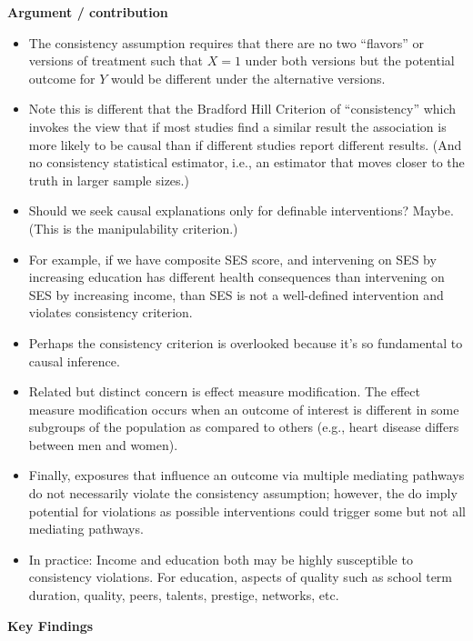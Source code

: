 \documentclass[
]{book}
\providecommand{\tightlist}{%
  \setlength{\itemsep}{0pt}\setlength{\parskip}{0pt}}
\begin{document}
\textbf{Argument / contribution}

\begin{itemize}
\tightlist
\item
  The consistency assumption requires that there are no two ``flavors'' or versions of treatment such that \(X = 1\) under both versions but the potential outcome for \(Y\) would be different under the alternative versions.
\item
  Note this is different that the Bradford Hill Criterion of ``consistency'' which invokes the view that if most studies find a similar result the association is more likely to be causal than if different studies report different results. (And no consistency statistical estimator, i.e., an estimator that moves closer to the truth in larger sample sizes.)
\item
  Should we seek causal explanations only for definable interventions? Maybe. (This is the manipulability criterion.)
\item
  For example, if we have composite SES score, and intervening on SES by increasing education has different health consequences than intervening on SES by increasing income, than SES is not a well-defined intervention and violates consistency criterion.
\item
  Perhaps the consistency criterion is overlooked because it's so fundamental to causal inference.
\item
  Related but distinct concern is effect measure modification. The effect measure modification occurs when an outcome of interest is different in some subgroups of the population as compared to others (e.g., heart disease differs between men and women).
\item
  Finally, exposures that influence an outcome via multiple mediating pathways do not necessarily violate the consistency assumption; however, the do imply potential for violations as possible interventions could trigger some but not all mediating pathways.
\item
  In practice: Income and education both may be highly susceptible to consistency violations. For education, aspects of quality such as school term duration, quality, peers, talents, prestige, networks, etc.
\end{itemize}

\textbf{Key Findings}
\end{document}
